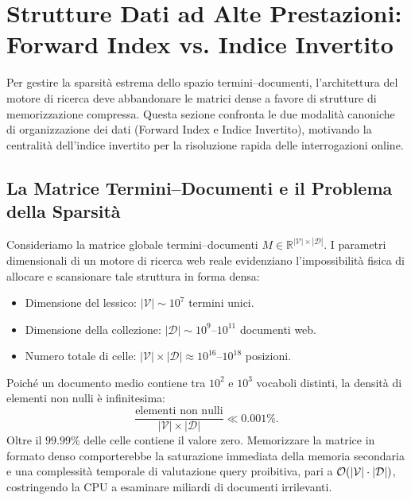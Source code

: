 \FloatBarrier
\section{Strutture Dati ad Alte Prestazioni: Forward Index vs. Indice Invertito}
\label{sec:forward-vs-inverted}

Per gestire la sparsit\`a estrema dello spazio termini--documenti, l'architettura del motore di ricerca deve abbandonare le matrici dense a favore di strutture di memorizzazione compressa. Questa sezione confronta le due modalit\`a canoniche di organizzazione dei dati (Forward Index e Indice Invertito), motivando la centralit\`a dell'indice invertito per la risoluzione rapida delle interrogazioni online.

\FloatBarrier
\subsection{La Matrice Termini--Documenti e il Problema della Sparsit\`a}
\label{subsec:matrice-termini-documenti-sparsita}
Consideriamo la matrice globale termini--documenti $M \in \mathbb{R}^{|\mathcal{V}| \times |\mathcal{D}|}$. I parametri dimensionali di un motore di ricerca web reale evidenziano l'impossibilit\`a fisica di allocare e scansionare tale struttura in forma densa:
\begin{itemize}
    \item Dimensione del lessico: $|\mathcal{V}| \sim 10^7$ termini unici.
    \item Dimensione della collezione: $|\mathcal{D}| \sim 10^9 \text{--} 10^{11}$ documenti web.
    \item Numero totale di celle: $|\mathcal{V}| \times |\mathcal{D}| \approx 10^{16} \text{--} 10^{18}$ posizioni.
\end{itemize}
Poich\'e un documento medio contiene tra $10^2$ e $10^3$ vocaboli distinti, la densit\`a di elementi non nulli \`e infinitesima:
\begin{equation}
\frac{\text{elementi non nulli}}{|\mathcal{V}| \times |\mathcal{D}|} \ll 0.001\%.
\end{equation}
Oltre il $99.99\%$ delle celle contiene il valore zero. Memorizzare la matrice in formato denso comporterebbe la saturazione immediata della memoria secondaria e una complessit\`a temporale di valutazione query proibitiva, pari a $\mathcal{O}\!\left(|\mathcal{V}| \cdot |\mathcal{D}|\right)$, costringendo la CPU a esaminare miliardi di documenti irrilevanti.

\FloatBarrier
